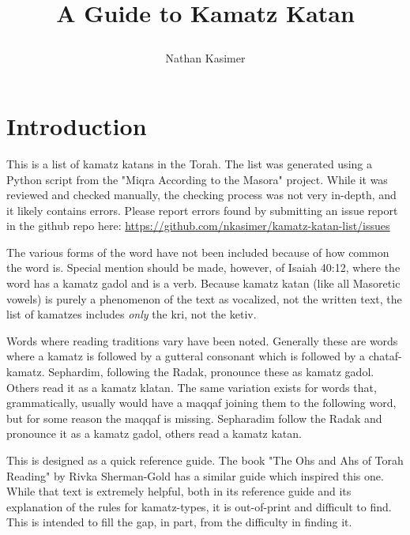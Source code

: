 \documentclass[14pt]{book}
\begin{document}
	
\title{
	
	A Guide to Kamatz Katan}

\author{Nathan Kasimer}

\date{}

\maketitle

\tableofcontents

\chapter{Introduction}
This is a list of kamatz katans in the Torah.  The list was generated using a Python script from the "Miqra According to the Masora" project.  While it was reviewed and checked manually, the checking process was not very in-depth, and it likely contains errors.  Please report errors found by submitting an issue report in the github repo here: \url{https://github.com/nkasimer/kamatz-katan-list/issues}

The various forms of the word  have not been included because of how common the word is.  Special mention should be made, however, of Isaiah 40:12, where the word  has a kamatz gadol and is a verb.  Because kamatz katan (like all Masoretic vowels) is purely a phenomenon of the text as vocalized, not the written text, the list of kamatzes includes \textit{only} the kri, not the ketiv.

Words where reading traditions vary have been noted.  Generally these are words where a kamatz is followed by a gutteral consonant which is followed by a chataf-kamatz.  Sephardim, following the Radak, pronounce these as kamatz gadol. Others read it as a kamatz klatan. The same variation exists for words that, grammatically, usually would have a maqqaf joining them to the following word, but for some reason the maqqaf is missing. Sepharadim follow the Radak and pronounce it as a kamatz gadol, others read a kamatz katan.

This is designed as a quick reference guide.  The book "The Ohs and Ahs of Torah Reading" by Rivka Sherman-Gold has a similar guide which inspired this one.  While that text is extremely helpful, both in its reference guide and its explanation of the rules for kamatz-types, it is out-of-print and difficult to find. This is intended to fill the gap, in part, from the difficulty in finding it.
\end{document}
